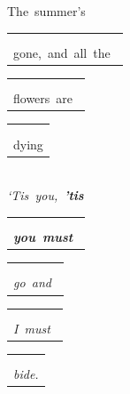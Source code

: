 \documentclass[12pt,a5paper,openany]{memoir}
\begin{document}
The~summer’s~\begin{tabular}[b]{l}
    \textbf{\sffamily\color{red}{D}}\\\textbf{\sffamily\color{red}\color{blue}{IV}}\\gone,~and~all~the~\mbox{}\end{tabular}\begin{tabular}[b]{l}
    \small{\sffamily\color{LightRed}{D7}}\\\small{\sffamily\color{LightRed}\color{blue}{IV7}}\\flowers~are~\mbox{}\end{tabular}\begin{tabular}[b]{l}
    \textbf{\sffamily\color{red}{G}}\\\textbf{\sffamily\color{red}\color{blue}{VIIb}}\\dying\mbox{}\end{tabular}\\
\emph{‘Tis~you,~\textbf{’tis~}}\begin{tabular}[b]{l}
    \textbf{\sffamily\color{red}{D}}\\\textbf{\sffamily\color{red}\color{blue}{IV}}\\\emph{\textbf{you~must}~}\mbox{}\end{tabular}\begin{tabular}[b]{l}
    \textbf{\sffamily\color{red}{Em}}\\\textbf{\sffamily\color{red}\color{blue}{Vm}}\\\emph{go~and~}\mbox{}\end{tabular}\begin{tabular}[b]{l}
    \textbf{\sffamily\color{red}{A7}}\\\textbf{\sffamily\color{red}\color{blue}{I7}}\\\emph{I~must~}\mbox{}\end{tabular}\begin{tabular}[b]{l}
    \textbf{\sffamily\color{red}{D}}\\\textbf{\sffamily\color{red}\color{blue}{IV}}\\\emph{bide.}\mbox{}\end{tabular}

    \vspace{\parskip}
\end{document}
